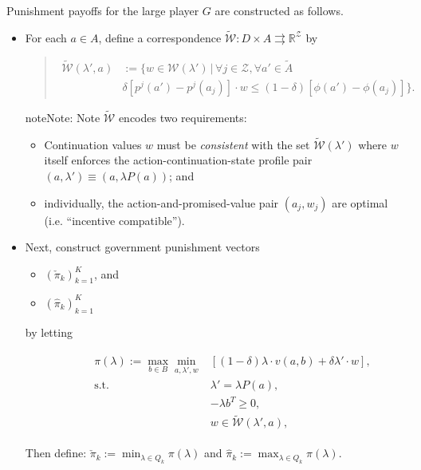 \documentclass[a4paper,10pt,english]{sphinxmanual}
\begin{document}
Punishment payoffs for the large player \(G\) are constructed as follows.
\begin{itemize}
\item {} 
For each \(a\in A\), define a correspondence \(\tilde{{\mathcal{W}}}:D\times A \rightrightarrows \mathbb{R}^\mathcal{Z}\) by
\begin{quote}
\begin{align*}
\tilde{{\mathcal{W}}}(\lambda',a)&:=\{w\in {\mathcal{W}}(\lambda')\,|\, \forall j\in \mathcal{Z}, \forall a'\in \tilde{A}
\\
& \delta[p^j(a')-p^j(a_j)]\cdot w\leq (1-\delta) [\phi(a')-\phi(a_j)]\}.
\end{align*}\end{quote}

\begin{notice}{note}{Note:}
Note \(\tilde{\mathcal{W}}\) encodes two requirements:
\begin{itemize}
\item {} 
Continuation values \(w\) must be \emph{consistent} with the set \(\tilde{\mathcal{W}}(\lambda')\) where \(w\) itself enforces the action-continuation-state profile pair \((a,\lambda') \equiv (a,\lambda P(a))\); and

\item {} 
individually, the action-and-promised-value pair \((a_j, w_j)\)
are optimal (i.e. ``incentive compatible'').

\end{itemize}
\end{notice}

\item {} 
Next, construct government punishment vectors
\begin{itemize}
\item {} 
\((\check{\pi}_k)_{k=1}^K\), and

\item {} 
\((\hat{\pi}_k)_{k=1}^K\)

\end{itemize}
\begin{description}
\item[{by letting}] \leavevmode{}\label{payoff_bilinear_punish:equation-pival_k}\begin{gather}
\begin{split}\pi(\lambda):=\max_{b\in B} \min_{a,\lambda',w}&[(1-\delta)\lambda\cdot v(a,b)+\delta \lambda'\cdot w],\\
\text{s.t.}\,\,& \lambda'=\lambda P(a),\\
& -\lambda b^T \geq 0,\\
& w\in \tilde{{\mathcal{W}}}(\lambda',a),\end{split}\label{payoff_bilinear_punish-pival_k}
\end{gather}
\end{description}

Then define: \(\check{\pi}_k:=\min_{\lambda\in Q_k}\pi(\lambda)\) and \(\hat{\pi}_k:=\max_{\lambda\in Q_k}\pi(\lambda)\).

\end{itemize}
\end{document}
